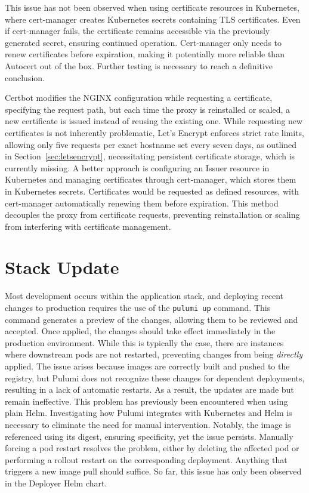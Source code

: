 This issue has not been observed when using certificate resources in Kubernetes, where cert-manager creates Kubernetes secrets containing TLS certificates. Even if cert-manager fails, the certificate remains accessible via the previously generated secret, ensuring continued operation. Cert-manager only needs to renew certificates before expiration, making it potentially more reliable than Autocert out of the box. Further testing is necessary to reach a definitive conclusion.

Certbot modifies the NGINX configuration while requesting a certificate, specifying the request path, but each time the proxy is reinstalled or scaled, a new certificate is issued instead of reusing the existing one. While requesting new certificates is not inherently problematic, Let's Encrypt enforces strict rate limits, allowing only five requests per exact hostname set every seven days, as outlined in Section~\ref{sec:letsencrypt}, necessitating persistent certificate storage, which is currently missing. A better approach is configuring an Issuer resource in Kubernetes and managing certificates through cert-manager, which stores them in Kubernetes secrets. Certificates would be requested as defined resources, with cert-manager automatically renewing them before expiration. This method decouples the proxy from certificate requests, preventing reinstallation or scaling from interfering with certificate management.

\section{Stack Update}
Most development occurs within the application stack, and deploying recent changes to production requires the use of the \texttt{pulumi up} command. This command generates a preview of the changes, allowing them to be reviewed and accepted. Once applied, the changes should take effect immediately in the production environment. While this is typically the case, there are instances where downstream pods are not restarted, preventing changes from being \textit{directly} applied. The issue arises because images are correctly built and pushed to the registry, but Pulumi does not recognize these changes for dependent deployments, resulting in a lack of automatic restarts. As a result, the updates are made but remain ineffective. This problem has previously been encountered when using plain Helm. Investigating how Pulumi integrates with Kubernetes and Helm is necessary to eliminate the need for manual intervention. Notably, the image is referenced using its digest, ensuring specificity, yet the issue persists. Manually forcing a pod restart resolves the problem, either by deleting the affected pod or performing a rollout restart on the corresponding deployment. Anything that triggers a new image pull should suffice. So far, this issue has only been observed in the Deployer Helm chart.

